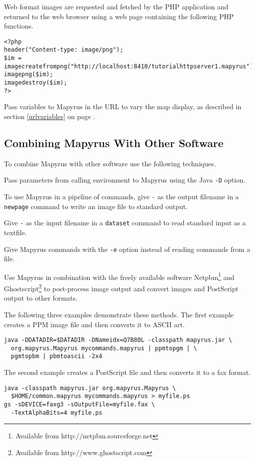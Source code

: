 Web format images are requested and fetched by the PHP
application and returned to the web browser using a
web page containing the following PHP functions.

\begin{verbatim}
<?php
header("Content-type: image/png");
$im = imagecreatefrompng("http://localhost:8410/tutorialhttpserver1.mapyrus");
imagepng($im);
imagedestroy($im);
?>
\end{verbatim}

Pass variables to Mapyrus in the URL to vary the map display,
as described in section \ref{urlvariables}
on page \pageref{urlvariables}.

\subsection{Combining Mapyrus With Other Software}

To combine Mapyrus with other software use the following
techniques.

Pass parameters from calling environment to Mapyrus using the Java
\texttt{-D} option.

To use Mapyrus in a pipeline of commands,
give \texttt{-} as the output filename in a
\texttt{newpage}
command to write an image file to standard output.

Give \texttt{-} as the input filename in a
\texttt{dataset}
command to read standard input as a textfile.

Give Mapyrus commands with the \texttt{-e} option
instead of reading commands from a file.

Use Mapyrus in combination with the freely available software
Netpbm\footnote{Available from http://netpbm.sourceforge.net} and
Ghostscript\footnote{Available from http://www.ghostscript.com} to post-process
image output and convert images and PostScript output to other formats.

The following three examples demonstrate these methods.
The first example creates a PPM image file and then converts it to ASCII art.

\begin{verbatim}
java -DDATADIR=$DATADIR -DNameidx=Q7B80L -classpath mapyrus.jar \
  org.mapyrus.Mapyrus mycommands.mapyrus | ppmtopgm | \
  pgmtopbm | pbmtoascii -2x4
\end{verbatim}

The second example creates a PostScript file and then converts it
to a fax format.

\begin{verbatim}
java -classpath mapyrus.jar org.mapyrus.Mapyrus \
  $HOME/common.mapyrus mycommands.mapyrus > myfile.ps
gs -sDEVICE=faxg3 -sOutputFile=myfile.fax \
  -TextAlphaBits=4 myfile.ps
\end{verbatim}

